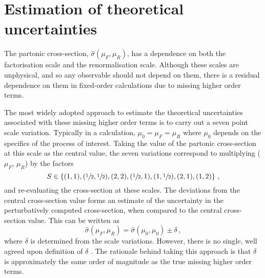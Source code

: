 \documentclass[main.tex]{subfiles}
\begin{document}
    \section{Estimation of theoretical uncertainties}\label{sec:scale_variations}
    The partonic cross-section, $\hat{\sigma}(\mu_{F}, \mu_{R})$, has
    a dependence on both the factorisation scale and the
    renormalisation scale. Although these scales are unphysical,
    and so any observable should not depend on them,
    there is a residual dependence on them in fixed-order
    calculations due to missing higher order terms.

    The most widely adopted approach to estimate the
    theoretical uncertainties associated with these
    missing higher order terms is to carry out a seven point
    scale variation. Typically in a calculation,
    $\mu_{0} = \mu_{F} = \mu_{R}$ where $\mu_{0}$ depends on the specifics
    of the process of interest. Taking the value of the
    partonic cross-section at this scale as the central value,
    the seven variations correspond to multiplying ($\mu_{F}, \, \mu_{R}$) by the factors 
    \begin{equation}\label{eqn:scale_variations}
        S \in \left\{(1, 1), (\sfrac{1}{2}, \sfrac{1}{2}), (2, 2), (\sfrac{1}{2}, 1), (1, \sfrac{1}{2}), (2, 1), (1, 2) \right\} \, ,
    \end{equation}
    and re-evaluating the cross-section at these scales.
    The deviations from the central cross-section value
    forms an estimate of the uncertainty in the perturbatively
    computed cross-section, when compared to the central cross-section value.
    This can be written as
    \begin{equation}
        \hat{\sigma}(\mu_{F}, \mu_{R}) = \hat{\sigma}(\mu_{0}, \mu_{0}) \pm \delta \, ,
    \end{equation}
    where $\delta$ is determined from the scale variations.
    However, there is no single, well agreed upon definition
    of $\delta$ \cite{Cacciari:2011ze}.
    The rationale behind taking this approach is that $\delta$
    is approximately the same order of magnitude as the true missing
    higher order terms.
\end{document}
